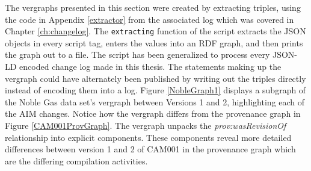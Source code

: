 \begin{figure}
	\centering
\end{figure}
The \glspl{vergraph} presented in this section were created by extracting triples, using the code in Appendix \ref{extractor} from the associated \gls{log} which was covered in Chapter \ref{ch:changelog}.
The \texttt{extracting} function of the script extracts the JSON objects in every script tag, enters the values into an RDF graph, and then prints the graph out to a file.
The script has been generalized to process every JSON-LD encoded change log made in this thesis.
The statements making up the \gls{vergraph} could have alternately been published by writing out the triples directly instead of encoding them into a \gls{log}.
Figure \ref{NobleGraph1} displays a subgraph of the Noble Gas data set's \gls{vergraph} between Versions 1 and 2, highlighting each of the \gls{AIM} \glspl{change}.
Notice how the \gls{vergraph} differs from the provenance graph in Figure \ref{CAM001ProvGraph}.
The \gls{vergraph} unpacks the \textit{prov:wasRevisionOf} relationship into explicit components.
These components reveal more detailed differences between version 1 and 2 of CAM001 in the provenance graph which are the differing compilation activities.
\begin{figure}
	\centering
\end{figure}
